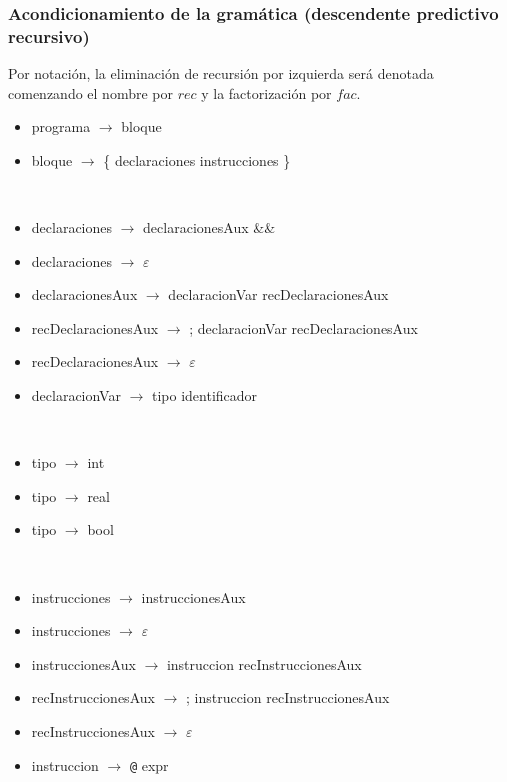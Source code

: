 \documentclass[11pt]{article}
\begin{document}
            \subsubsection{Acondicionamiento de la gramática (descendente predictivo recursivo)}
            Por notación, la eliminación de recursión por izquierda será denotada comenzando el nombre por $rec$ y la factorización por $fac$.  
            \begin{itemize}
                \item programa $\rightarrow$ bloque
                \item bloque $\rightarrow$ \{ declaraciones instrucciones \}
            \end{itemize}
            \
            \begin{itemize}
                \item declaraciones $\rightarrow$ declaracionesAux \&\&
                \item declaraciones $\rightarrow$ $\varepsilon$
                \item declaracionesAux $\rightarrow$ declaracionVar recDeclaracionesAux
                \item recDeclaracionesAux $\rightarrow$ ; declaracionVar recDeclaracionesAux
                \item recDeclaracionesAux $\rightarrow$ $\varepsilon$
                \item declaracionVar $\rightarrow$ tipo identificador
            \end{itemize}
            \ 
            \begin{itemize}
                \item tipo $\rightarrow$ int
                \item tipo $\rightarrow$ real
                \item tipo $\rightarrow$ bool
            \end{itemize}
            \ 
            \begin{itemize}
                \item instrucciones $\rightarrow$ instruccionesAux
                \item instrucciones $\rightarrow$ $\varepsilon$
                \item instruccionesAux $\rightarrow$ instruccion recInstruccionesAux 
                \item recInstruccionesAux  $\rightarrow$ ; instruccion recInstruccionesAux 
                \item recInstruccionesAux  $\rightarrow$ $\varepsilon$ 
                \item instruccion $\rightarrow$ \verb|@| expr 
            \end{itemize}
\end{document}
